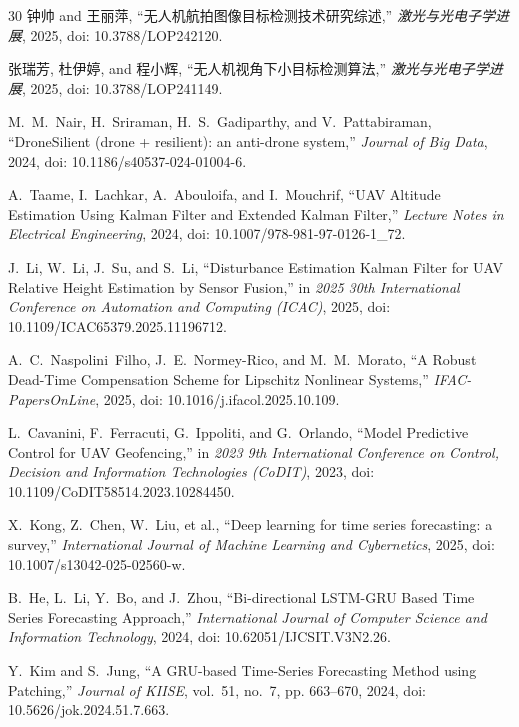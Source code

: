 \documentclass[journal]{IEEEtran}
\begin{document}
\begin{thebibliography}{30}
钟帅 and 王丽萍, ``无人机航拍图像目标检测技术研究综述,'' \emph{激光与光电子学进展}, 2025, doi: 10.3788/LOP242120.

张瑞芳, 杜伊婷, and 程小辉, ``无人机视角下小目标检测算法,'' \emph{激光与光电子学进展}, 2025, doi: 10.3788/LOP241149.

M.~M.~Nair, H.~Sriraman, H.~S.~Gadiparthy, and V.~Pattabiraman, ``DroneSilient (drone + resilient): an anti-drone system,'' \emph{Journal of Big Data}, 2024, doi: 10.1186/s40537-024-01004-6.

A.~Taame, I.~Lachkar, A.~Abouloifa, and I.~Mouchrif, ``UAV Altitude Estimation Using Kalman Filter and Extended Kalman Filter,'' \emph{Lecture Notes in Electrical Engineering}, 2024, doi: 10.1007/978-981-97-0126-1\_72.

J.~Li, W.~Li, J.~Su, and S.~Li, ``Disturbance Estimation Kalman Filter for UAV Relative Height Estimation by Sensor Fusion,'' in \emph{2025 30th International Conference on Automation and Computing (ICAC)}, 2025, doi: 10.1109/ICAC65379.2025.11196712.

A.~C.~Naspolini~Filho, J.~E.~Normey-Rico, and M.~M.~Morato, ``A Robust Dead-Time Compensation Scheme for Lipschitz Nonlinear Systems,'' \emph{IFAC-PapersOnLine}, 2025, doi: 10.1016/j.ifacol.2025.10.109.

L.~Cavanini, F.~Ferracuti, G.~Ippoliti, and G.~Orlando, ``Model Predictive Control for UAV Geofencing,'' in \emph{2023 9th International Conference on Control, Decision and Information Technologies (CoDIT)}, 2023, doi: 10.1109/CoDIT58514.2023.10284450.

X.~Kong, Z.~Chen, W.~Liu, et al., ``Deep learning for time series forecasting: a survey,'' \emph{International Journal of Machine Learning and Cybernetics}, 2025, doi: 10.1007/s13042-025-02560-w.

B.~He, L.~Li, Y.~Bo, and J.~Zhou, ``Bi-directional LSTM-GRU Based Time Series Forecasting Approach,'' \emph{International Journal of Computer Science and Information Technology}, 2024, doi: 10.62051/IJCSIT.V3N2.26.

Y.~Kim and S.~Jung, ``A GRU-based Time-Series Forecasting Method using Patching,'' \emph{Journal of KIISE}, vol.~51, no.~7, pp. 663--670, 2024, doi: 10.5626/jok.2024.51.7.663.


\end{thebibliography}
\end{document}
